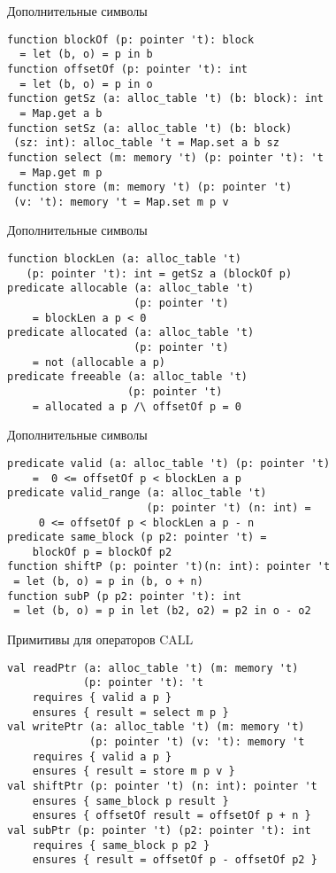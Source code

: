 \documentclass[hyperref={unicode=true}]{beamer}
\begin{document}
    \begin{frame}[fragile]{Дополнительные символы}
    \begin{lstlisting}
function blockOf (p: pointer 't): block
  = let (b, o) = p in b
function offsetOf (p: pointer 't): int
  = let (b, o) = p in o
function getSz (a: alloc_table 't) (b: block): int
  = Map.get a b
function setSz (a: alloc_table 't) (b: block)
 (sz: int): alloc_table 't = Map.set a b sz
function select (m: memory 't) (p: pointer 't): 't
  = Map.get m p
function store (m: memory 't) (p: pointer 't)
 (v: 't): memory 't = Map.set m p v
    \end{lstlisting}
    \end{frame}

    \begin{frame}[fragile]{Дополнительные символы}
    \begin{lstlisting}
function blockLen (a: alloc_table 't)
   (p: pointer 't): int = getSz a (blockOf p)
predicate allocable (a: alloc_table 't)
                    (p: pointer 't)
    = blockLen a p < 0
predicate allocated (a: alloc_table 't)
                    (p: pointer 't)
    = not (allocable a p)
predicate freeable (a: alloc_table 't)
                   (p: pointer 't)
    = allocated a p /\ offsetOf p = 0
    \end{lstlisting}
    \end{frame}

    \begin{frame}[fragile]{Дополнительные символы}
    \begin{lstlisting}
predicate valid (a: alloc_table 't) (p: pointer 't)
    =  0 <= offsetOf p < blockLen a p
predicate valid_range (a: alloc_table 't)
                      (p: pointer 't) (n: int) =
     0 <= offsetOf p < blockLen a p - n
predicate same_block (p p2: pointer 't) =
    blockOf p = blockOf p2
function shiftP (p: pointer 't)(n: int): pointer 't
 = let (b, o) = p in (b, o + n)
function subP (p p2: pointer 't): int
 = let (b, o) = p in let (b2, o2) = p2 in o - o2
    \end{lstlisting}
    \end{frame}

    \begin{frame}[fragile]{Примитивы для операторов CALL}
    \begin{lstlisting}
val readPtr (a: alloc_table 't) (m: memory 't)
            (p: pointer 't): 't
    requires { valid a p }
    ensures { result = select m p }
val writePtr (a: alloc_table 't) (m: memory 't)
             (p: pointer 't) (v: 't): memory 't
    requires { valid a p }
    ensures { result = store m p v }
val shiftPtr (p: pointer 't) (n: int): pointer 't
    ensures { same_block p result }
    ensures { offsetOf result = offsetOf p + n }
val subPtr (p: pointer 't) (p2: pointer 't): int
    requires { same_block p p2 }
    ensures { result = offsetOf p - offsetOf p2 }
    \end{lstlisting}
    \end{frame}
\end{document}
